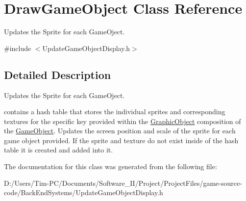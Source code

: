 \hypertarget{class_draw_game_object}{}\section{Draw\+Game\+Object Class Reference}
\label{class_draw_game_object}


Updates the Sprite for each Game\+Oject.  




{\ttfamily \#include $<$Update\+Game\+Object\+Display.\+h$>$}



\subsection{Detailed Description}
Updates the Sprite for each Game\+Oject. 

contains a hash table that stores the individual sprites and corresponding textures for the specific key provided within the \hyperlink{class_graphic_object}{Graphic\+Object} composition of the \hyperlink{class_game_object}{Game\+Object}. Updates the screen position and scale of the sprite for each game object provided. If the sprite and texture do not exist inside of the hash table it is created and added into it. 

The documentation for this class was generated from the following file\+:\begin{DoxyCompactItemize}
\item 
D\+:/\+Users/\+Tim-\/\+P\+C/\+Documents/\+Software\+\_\+\+I\+I/\+Project/\+Project\+Files/game-\/source-\/code/\+Back\+End\+Systems/Update\+Game\+Object\+Display.\+h\end{DoxyCompactItemize}
